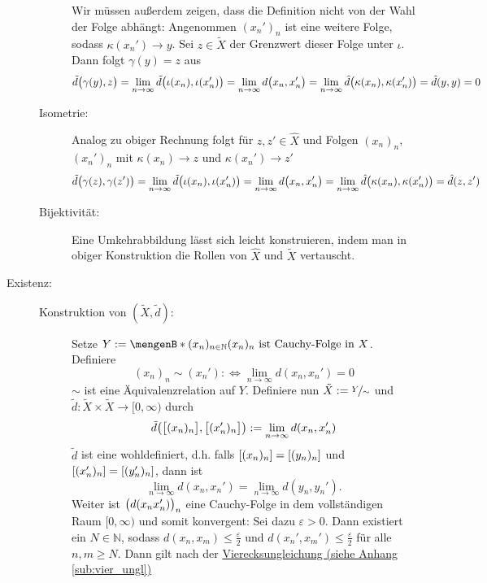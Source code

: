 \begin{description}
\begin{description}
		Wir müssen außerdem zeigen, dass die Definition nicht von der Wahl der Folge abhängt: Angenommen $(x_n')_n$ ist eine weitere Folge, sodass $\kappa(x_n') \to y$.
		Sei $z \in \tilde{X}$ der Grenzwert dieser Folge unter $\iota$. Dann folgt $\gamma(y)=z$ aus
		\begin{align*}
			\tilde{d}\enbrace[\big]{\gamma(y),z} = \lim_{n \to \infty} \tilde{d}\enbrace[\big]{\iota(x_n), \iota(x_n')} = \lim_{n \to \infty} d \enbrace[\big]{x_n,x_n'}
			= \lim_{n \to \infty} \hat{d}\enbrace[\big]{\kappa(x_n), \kappa(x_n')} = \hat{d}(y,y) =0
		\end{align*}
		\item[Isometrie:] Analog zu obiger Rechnung folgt für $z,z' \in \hat{X}$ und Folgen $(x_n)_n$, $(x_n')_n$ mit $\kappa(x_n) \to z$ und $\kappa(x_n')\to z'$
		\begin{align*}
			\tilde{d}\enbrace[\big]{\gamma(z),\gamma(z')} = \lim_{n \to \infty} \tilde{d}\enbrace[\big]{\iota(x_n), \iota(x_n')} = \lim_{n \to \infty} d \enbrace[\big]{x_n,x_n'}
			= \lim_{n \to \infty} \hat{d}\enbrace[\big]{\kappa(x_n), \kappa(x_n')} = \hat{d}(z,z')
		\end{align*}
		\item[Bijektivität:] Eine Umkehrabbildung lässt sich leicht konstruieren, indem man in obiger Konstruktion die Rollen von $\hat{X}$ und $\tilde{X}$ vertauscht.
	\end{description}
	\item[Existenz:] \begin{description}
		\item[Konstruktion von $(\tilde{X}, \tilde{d})$:] Setze $Y := \set[(x_n)_{n \in \mathds{N}}]{(x_n)_n \text{ ist Cauchy-Folge in }X}$. Definiere 
	\[
		(x_n)_n \sim (x_n') :\iff \lim_{ n \to \infty} d(x_n, x_n') = 0
	\]
	$\sim$ ist eine Äquivalenzrelation auf $Y$. Definiere nun $\tilde{X} := \nicefrac{Y}{\sim}$ und $\tilde{d} :  \tilde{X} \times \tilde{X} \to [0, \infty)$ durch
	\[
		\tilde{d} \enbrace*{\benbrace[\big]{(x_n)_n} , \benbrace[\big]{(x_n')_n}  } := \lim_{ n \to \infty} d(x_n , x_n') 
	\]
	$\tilde{d}$ ist eine wohldefiniert, d.h. falls $\benbrace*{(x_n)_n} = \benbrace*{(y_n)_n} $ und $\benbrace*{(x_n')_n} = \benbrace*{(y_n')_n}$, dann ist
	\[
		\lim_{n \to \infty} d(x_n , x_n') = \lim_{n \to \infty} d(y_n, y_n'). \tag*{(leichte Übung)}
	\]
	Weiter ist $\enbrace[\big]{d(x_n x_n')}_n$ eine Cauchy-Folge in dem vollständigen Raum $[0,\infty)$ und somit 
	konvergent: Sei dazu $\varepsilon>0$. Dann existiert ein $N \in \mathds{N}$, sodass $d(x_n,x_m) \le \frac{\varepsilon}{2}$ und $d(x_n', x_m') \le \frac{\varepsilon}{2}$ für alle $n,m \ge N$. Dann gilt nach der \hyperref[sub:vier_ungl]{Vierecksungleichung (siehe Anhang \ref*{sub:vier_ungl})}

\end{description}
\end{description}
